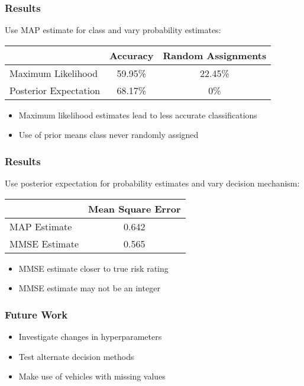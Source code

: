 \documentclass{beamer}
\begin{document}
\begin{frame}
	\frametitle{Results}
	Use MAP estimate for class and vary probability estimates:
	\begin{center}
		\begin{tabular}{ l|c c }
			                      & Accuracy & Random Assignments\\
			\hline
			Maximum Likelihood    & 59.95\%  & 22.45\% \\
			Posterior Expectation & 68.17\%  & 0\%
		\end{tabular}
	\end{center}
	\begin{itemize}
		\item Maximum likelihood estimates lead to less accurate classifications
		\item Use of prior means class never randomly assigned
	\end{itemize}
\end{frame}

\begin{frame}
	\frametitle{Results}
	Use posterior expectation for probability estimates and vary decision mechanism:
	\begin{center}
		\begin{tabular}{ l|c }
			              & Mean Square Error   \\
			\hline
			MAP Estimate  & 0.642 \\
			MMSE Estimate & 0.565
		\end{tabular}
	\end{center}
	\begin{itemize}
		\item MMSE estimate closer to true risk rating
		\item MMSE estimate may not be an integer
	\end{itemize}
\end{frame}

\begin{frame}
	\frametitle{Future Work}
	\begin{itemize}
		\item Investigate changes in hyperparameters
		\item Test alternate decision methods
		\item Make use of vehicles with missing values
	\end{itemize}
\end{frame}
 
\end{document}
